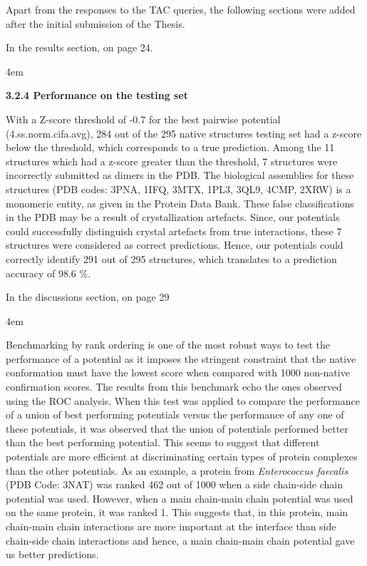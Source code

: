 \documentclass[a4paper, 12pt, twoside]{article}
\begin{document}
Apart from the responses to the TAC queries, the following sections were added after the initial submission of the Thesis.
\vspace{14pt}

In the results section, on page 24.
\vspace{14pt}
\par
\begingroup
\footnotesize
\leftskip4em
\rightskip\leftskip

\noindent \textbf{3.2.4 Performance on the testing set}

With a Z-score threshold of -0.7 for the best pairwise potential (4.ss.norm.cifa.avg), 284 out of the 295 native structures testing set had a z-score below the threshold, which corresponds to a true prediction. Among the 11 structures which had a z-score greater than the threshold, 7 structures were incorrectly submitted as dimers in the PDB. The biological assemblies for these structures (PDB codes: 3PNA, 1IFQ, 3MTX, 1PL3, 3QL9, 4CMP, 2XRW) is a monomeric entity, as given in the Protein Data Bank. These false classifications in the PDB may be a result of crystallization artefacts. Since, our potentials could successfully distinguish crystal artefacts from true interactions, these 7 structures were considered as correct predictions. Hence, our potentials could correctly identify 291 out of 295 structures, which translates to a prediction accuracy of 98.6 \%.

\par
\endgroup
\vspace{14pt}
In the discussions section, on page 29
\vspace{14pt}
\par
\begingroup
\footnotesize
\leftskip4em
\rightskip\leftskip

Benchmarking by rank ordering is one of the most robust ways to test the performance of a potential as it imposes the stringent constraint that the native conformation must have the lowest score when compared with 1000 non-native confirmation scores. The results from this benchmark echo the ones observed using the ROC analysis. When this test was applied to compare the performance of a union of best performing potentials versus the performance of any one of these potentials, it was observed that the union of potentials performed better than the best performing potential. This seems to suggest that different potentials are more efficient at discriminating certain types of protein complexes than the other potentials. As an example, a protein from \textit{Enterococcus faecalis} (PDB Code: 3NAT) was ranked 462 out of 1000 when a side chain-side chain potential was used. However, when a main chain-main chain potential was used on the same protein, it was ranked 1. This suggests that, in this protein, main chain-main chain interactions are more important at the interface than side chain-side chain interactions and hence, a main chain-main chain potential gave us better predictions.

\par
\endgroup
\end{document}
